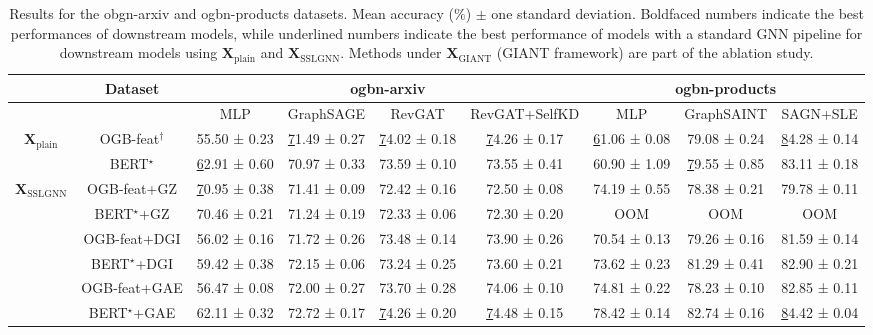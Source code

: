 \documentclass{article} \usepackage{iclr2022_conference,times}
\begin{document}
\begin{table}[t!]
\caption{Results for the obgn-arxiv and ogbn-products datasets. Mean accuracy ($\%$) $\pm$ one standard deviation. Boldfaced numbers indicate the best performances of downstream models, while underlined numbers indicate the best performance of models with a standard GNN pipeline for downstream models using $\mathbf{X}_{\text{plain}}$ and $\mathbf{X}_{\text{SSLGNN}}$. Methods under $\mathbf{X}_{\text{GIANT}}$ (GIANT framework) are part of the ablation study.
}
\vspace{0.1cm}
\centering
\setlength{\tabcolsep}{2.5pt}
\label{tab:ogbn-arxiv}
\scriptsize
\begin{tabular}{@{}cccccc|ccc@{}}
\toprule
\multicolumn{1}{l}{} &
  Dataset &
  \multicolumn{4}{c|}{ogbn-arxiv} &
  \multicolumn{3}{c}{ogbn-products} \\ \midrule
\multicolumn{1}{l}{} &
   &
  MLP &
  GraphSAGE &
  RevGAT &
  RevGAT+SelfKD &
  MLP &
  GraphSAINT &
  SAGN+SLE \\ \midrule
\multirow{2}{*}{$\mathbf{X}_{\text{plain}}$} &
  OGB-feat$^\dagger$ &
  55.50 ± 0.23 &
  {\ul 71.49 ± 0.27 } &
  {\ul 74.02 ± 0.18} &
  {\ul 74.26 ± 0.17} &
  {\ul 61.06 ± 0.08} &
  79.08 ± 0.24 &
  {\ul 84.28 ± 0.14} \\
 &
  BERT$^\star$ &
  {\ul 62.91 ± 0.60} &
  70.97 ± 0.33 &
  73.59 ± 0.10 &
  73.55 ± 0.41 &
  60.90 ± 1.09 &
  {\ul 79.55 ± 0.85} &
  83.11 ± 0.18 \\ \midrule
\multirow{8}{*}{$\mathbf{X}_{\text{SSLGNN}}$} &
  OGB-feat+GZ &
  {\ul 70.95 ± 0.38} &
  71.41 ± 0.09 &
  72.42 ± 0.16 &
  72.50 ± 0.08 &
  74.19 ± 0.55 &
  78.38 ± 0.21 &
  79.78 ± 0.11 \\
 &
  BERT$^\star$+GZ &
  70.46 ± 0.21 &
  71.24 ± 0.19 &
  72.33 ± 0.06 &
  72.30 ± 0.20 &
  OOM &
  OOM &
  OOM \\
 &
  OGB-feat+DGI &
  56.02 ± 0.16 &
  71.72 ± 0.26 &
  73.48 ± 0.14 &
  73.90 ± 0.26 &
  70.54 ± 0.13 &
  79.26 ± 0.16 &
  81.59 ± 0.14 \\
 &
  BERT$^\star$+DGI &
  59.42 ± 0.38 &
  72.15 ± 0.06 &
  73.24 ± 0.25 &
  73.60 ± 0.21 &
  73.62 ± 0.23 &
  81.29 ± 0.41 &
  82.90 ± 0.21 \\
 &
  OGB-feat+GAE &
  56.47 ± 0.08 &
  72.00 ± 0.27 &
  73.70 ± 0.28 &
  74.06 ± 0.10 &
  74.81 ± 0.22 &
  78.23 ± 0.10 &
  82.85 ± 0.11 \\
 &
  BERT$^\star$+GAE &
  62.11 ± 0.32 &
  72.72 ± 0.17 &
  {\ul 74.26 ± 0.20} &
  {\ul 74.48 ± 0.15} &
  78.42 ± 0.14 &
  82.74 ± 0.16 &
  {\ul 84.42 ± 0.04} \\

\end{tabular}
\end{table}
\end{document}
